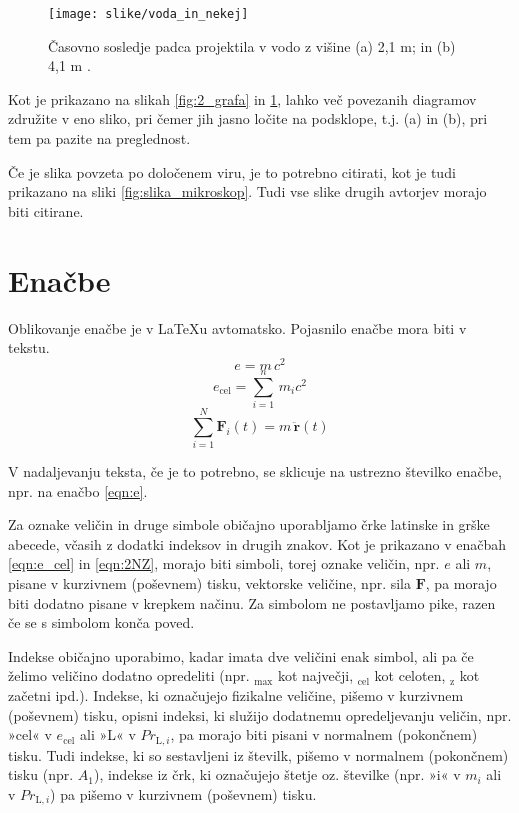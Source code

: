 \begin{figure}[ht!]
\begin{centering}
  \texttt{[image: slike/voda\_in\_nekej]}
  \caption{Časovno sosledje padca projektila v vodo z višine (a) 2,1 m; in (b) 
  4,1 m \cite{Loukides_2020}.} \label{fig:voda_in_nekej}
\end{centering}
\end{figure}

Kot je prikazano na slikah \ref{fig:2_grafa} in \ref{fig:voda_in_nekej}, lahko več povezanih diagramov združite v eno sliko, pri čemer jih jasno ločite na podsklope, t.j. (a) in (b), pri tem pa pazite na preglednost.

Če je slika povzeta po določenem viru, je to potrebno citirati, kot je tudi prikazano na sliki \ref{fig:slika_mikroskop}. Tudi vse slike drugih avtorjev morajo biti citirane.

\section{Enačbe}\label{sec:enacbe}

Oblikovanje enačbe je v \LaTeX u avtomatsko. Pojasnilo enačbe mora biti v 
tekstu.
\begin{equation}\label{eqn:e}
	e = m\,c^2
\end{equation}
\begin{equation}\label{eqn:e_cel}
	e_{\text{cel}}=\sum_{i=1}^{n}\,m_{i}c^2
\end{equation}
\begin{equation}\label{eqn:2NZ}
	\sum_{i=1}^{N}\bm{F}_i(t)=m\,\ddot{\bm{r}}(t)
\end{equation}

V nadaljevanju teksta, če je to potrebno, se sklicuje na ustrezno številko 
enačbe, npr. na enačbo \eqref{eqn:e}.

Za oznake veličin in druge simbole običajno uporabljamo črke latinske in grške 
abecede, včasih z dodatki indeksov in drugih znakov. Kot je prikazano v enačbah 
\eqref{eqn:e_cel} in \eqref{eqn:2NZ}, morajo biti simboli, torej oznake veličin, 
npr. $e$ ali $m$, pisane v kurzivnem (poševnem) tisku, vektorske veličine, npr. sila $\bm{F}$, pa morajo biti dodatno pisane v krepkem načinu. Za simbolom ne postavljamo pike, razen če se s simbolom konča poved.

Indekse običajno uporabimo, kadar imata dve veličini enak simbol, ali pa če 
želimo veličino dodatno opredeliti (npr. $_{\text{max}}$ kot največji, 
$_{\text{cel}}$ kot celoten, $_{\text{z}}$ kot začetni ipd.). Indekse, ki 
označujejo fizikalne veličine, pišemo v kurzivnem (poševnem) tisku, opisni 
indeksi, ki služijo dodatnemu opredeljevanju veličin, npr. »cel« v 
$e_{\text{cel}}$ ali »L« v $Pr_{\text{L},i}$, pa morajo biti pisani v normalnem 
(pokončnem) tisku. Tudi indekse, ki so sestavljeni iz številk, pišemo v 
normalnem (pokončnem) tisku (npr. $A_1$), indekse iz črk, ki označujejo štetje 
oz. številke (npr. »i« v $m_i$ ali v $Pr_{\text{L},i}$) pa pišemo v kurzivnem 
(poševnem) tisku.

